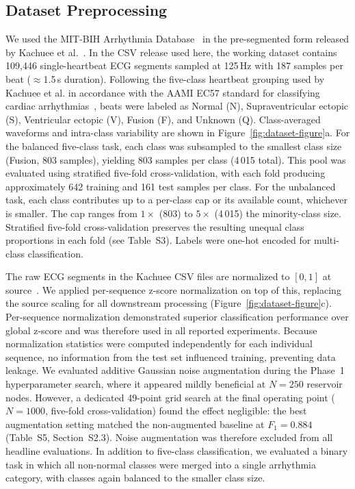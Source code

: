 \documentclass[journal=asbcd6,manuscript=article,keywords]{achemso}
\begin{document}
\subsection{Dataset Preprocessing}\label{sec:dataset-preprocessing}
We used the MIT-BIH Arrhythmia Database~\cite{Moody2001} in the pre-segmented form released by Kachuee et al.~\cite{Kachuee2018}. In the CSV release used here, the working dataset contains 109,446 single-heartbeat ECG segments sampled at 125\,Hz with 187 samples per beat ($\approx$1.5\,s duration). Following the five-class heartbeat grouping used by Kachuee et al. in accordance with the AAMI EC57 standard for classifying cardiac arrhythmias~\cite{AAMI1998}, beats were labeled as Normal (N), Supraventricular ectopic (S), Ventricular ectopic (V), Fusion (F), and Unknown (Q). Class-averaged waveforms and intra-class variability are shown in Figure~\ref{fig:dataset-figure}a. 
For the balanced five-class task, each class was subsampled to the smallest class size (Fusion, 803 samples), yielding 803 samples per class (4\,015 total). 
This pool was evaluated using stratified five-fold cross-validation, with each fold producing approximately 642 training and 161 test samples per class. 
For the unbalanced task, each class contributes up to a per-class cap or its available count, whichever is smaller. 
The cap ranges from $1\times$ (803) to $5\times$ (4\,015) the minority-class size. 
Stratified five-fold cross-validation preserves the resulting unequal class proportions in each fold (see Table~S3). 
Labels were one-hot encoded for multi-class classification.

The raw ECG segments in the Kachuee CSV files are normalized to $[0,1]$ at source~\cite{Kachuee2018}. We applied per-sequence z-score normalization on top of this, replacing the source scaling for all downstream processing (Figure~\ref{fig:dataset-figure}c). 
Per-sequence normalization demonstrated superior classification performance over global z-score and was therefore used in all reported experiments. 
Because normalization statistics were computed independently for each individual sequence, no information from the test set influenced training, preventing data leakage. 
We evaluated additive Gaussian noise augmentation during the Phase~1 hyperparameter search, where it appeared mildly beneficial at $N = 250$ reservoir nodes. 
However, a dedicated 49-point grid search at the final operating point ($N = 1000$, five-fold cross-validation) found the effect negligible: the best augmentation setting matched the non-augmented baseline at $F_1 = 0.884$ (Table~S5, Section~S2.3). 
Noise augmentation was therefore excluded from all headline evaluations.
In addition to five-class classification, we evaluated a binary task in which all non-normal classes were merged into a single arrhythmia category, with classes again balanced to the smaller class size.
\end{document}
